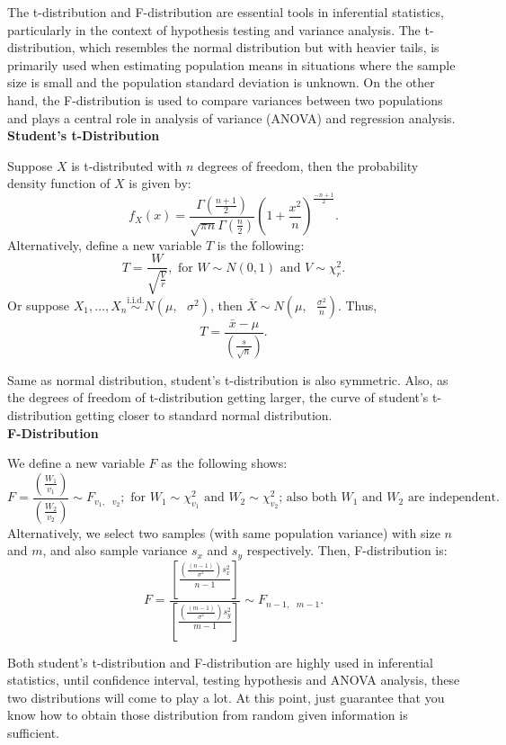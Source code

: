 The t-distribution and F-distribution are essential tools in inferential statistics, particularly in the context of hypothesis testing and variance analysis. The t-distribution, which resembles the normal distribution but with heavier tails, is primarily used when estimating population means in situations where the sample size is small and the population standard deviation is unknown. On the other hand, the F-distribution is used to compare variances between two populations and plays a central role in analysis of variance (ANOVA) and regression analysis.\\

\noindent
\textbf{Student's t-Distribution}

\begin{definition}
Suppose $X$ is t-distributed with $n$ degrees of freedom, then the probability density function of $X$ is given by: \[ f_{X}(x) = \frac{\Gamma(\frac{n+1}{2})}{\sqrt{\pi n} \Gamma(\frac{n}{2})} (1+\frac{x^2}{n})^{\frac{-n+1}{2}}.\]
Alternatively, define a new variable $T$ is the following: \[ T = \frac{W}{\sqrt{\frac{V}{r}}}, \text{ for $W \sim N(0, 1)  \text{ and } V \sim \chi_{r}^{2}$.}\]
Or suppose $X_1, ..., X_n \overset{\text{i.i.d.}}{\sim} N(\mu, \text{ } \sigma^2)$, then $\bar{X} \sim N(\mu, \text{ } \frac{\sigma^2}{n})$. Thus, \[ T = \frac{ \bar{x} - \mu}{(\frac{s}{\sqrt{n}})}.\]
\end{definition}

\noindent
Same as normal distribution, student's t-distribution is also symmetric. Also, as the degrees of freedom of t-distribution getting larger, the curve of student's t-distribution getting closer to standard normal distribution.\\

\noindent
\textbf{F-Distribution}

\begin{definition}
We define a new variable $F$ as the following shows: \[ F = \frac{ (\frac{W_1}{v_1}) }{ (\frac{W_2}{v_2})} \sim F_{v_1, \text{ } v_2}; \text{ for $W_1 \sim \chi_{v_1}^{2}$ and $W_2 \sim \chi_{v_2}^{2}$; also both $W_1$ and $W_2$ are independent.}\]
Alternatively, we select two samples (with same population variance) with size $n$ and $m$, and also sample variance $s_x$ and $s_y$ respectively. Then, F-distribution is: \[ F = \frac{ [\frac{ (\frac{(n-1)}{\sigma^2}) s_x^2}{n-1}] }{ [\frac{ (\frac{(m-1)}{\sigma^2}) s_y^2}{m-1}] } \sim F_{n-1, \text{ } m-1 }.\]
\end{definition}

\noindent
Both student's t-distribution and F-distribution are highly used in inferential statistics, until confidence interval, testing hypothesis and ANOVA analysis, these two distributions will come to play a lot. At this point, just guarantee that you know how to obtain those distribution from random given information is sufficient.